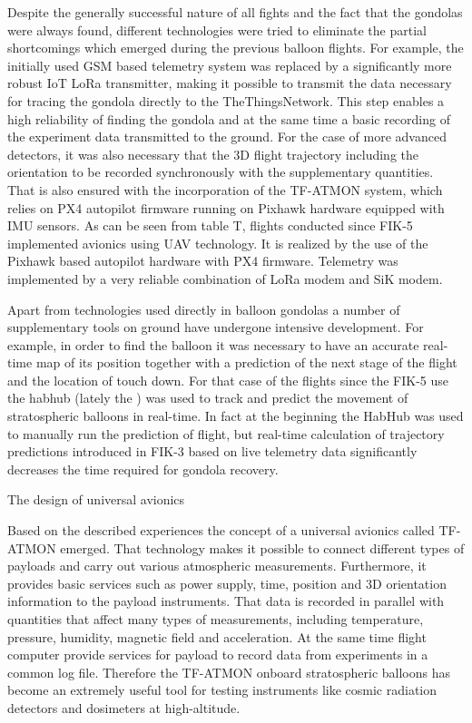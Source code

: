 Despite the generally successful nature of all fights and the fact that the gondolas were always found, different technologies were tried to eliminate the partial shortcomings which emerged during the previous balloon flights. For example, the initially used GSM based telemetry system was replaced by a significantly more robust IoT LoRa transmitter, making it possible to transmit the data necessary for tracing the gondola directly to the TheThingsNetwork. This step enables a high reliability of finding the gondola and at the same time a basic recording of the experiment data transmitted to the ground. For the case of more advanced detectors, it was also necessary that the 3D flight trajectory including the orientation to be recorded synchronously with the supplementary quantities. That is also ensured with the incorporation of the TF-ATMON system, which relies on PX4 autopilot firmware running on Pixhawk hardware equipped with IMU sensors. As can be seen from table T, flights conducted since FIK-5 implemented avionics using UAV technology. It is realized by the use of the Pixhawk based autopilot hardware with PX4 firmware. Telemetry was implemented by a very reliable combination of LoRa modem and SiK modem. 


Apart from technologies used directly in balloon  gondolas a number of supplementary tools on ground have undergone intensive development. For example, in order to find the balloon it was necessary to have an accurate real-time map of its position together with a prediction of the next stage of the flight and the location of touch down. For that case of the flights since the FIK-5 use the habhub  (lately the ) was used to track and predict the movement of stratospheric balloons in real-time. In fact at the beginning the HabHub was used to manually run the prediction of flight, but real-time calculation of trajectory predictions introduced in FIK-3 based on live telemetry data significantly decreases the time required for gondola recovery. 

\secc The design of universal avionics

Based on the described experiences the concept of a universal avionics called TF-ATMON emerged. That technology makes it possible to connect different types of payloads and carry out various atmospheric measurements. Furthermore, it provides basic services such as power supply, time, position and 3D orientation information to the payload instruments. That data is recorded in parallel with quantities that affect many types of measurements, including temperature, pressure, humidity, magnetic field and acceleration. At the same time flight computer provide services for payload to record data from experiments in a common log file. 
Therefore the TF-ATMON onboard stratospheric balloons has become an extremely useful tool for testing instruments like cosmic radiation detectors and dosimeters at high-altitude.

